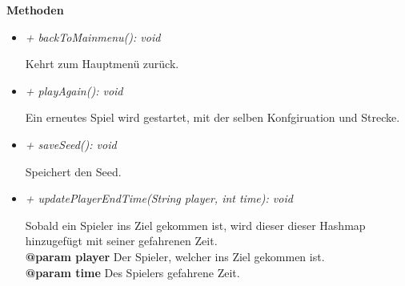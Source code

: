             \textbf{Methoden}					
            \begin{itemize}
                \item  \textit{+ backToMainmenu(): void} 
                    \begin{leftbar}[0.9\linewidth]
                        Kehrt zum Hauptmenü zurück.\\
                    \end{leftbar}
                \item  \textit{+ playAgain(): void} 
                    \begin{leftbar}[0.9\linewidth]
                        Ein erneutes Spiel wird gestartet, mit der selben Konfgiruation 
                        und Strecke.\\
                    \end{leftbar}
                \item  \textit{+ saveSeed(): void} 
                    \begin{leftbar}[0.9\linewidth]
                        Speichert den Seed.\\
                    \end{leftbar}
                \item  \textit{+ updatePlayerEndTime(String player, int time): void} 
                    \begin{leftbar}[0.9\linewidth]
                        Sobald ein Spieler ins Ziel gekommen ist, wird dieser dieser Hashmap 
                        hinzugefügt mit seiner gefahrenen Zeit.\\
                        \textbf{@param player} Der Spieler, welcher ins Ziel gekommen ist.\\
                        \textbf{@param time} Des Spielers gefahrene Zeit.\\
                    \end{leftbar}
            \end{itemize}
    \pagebreak